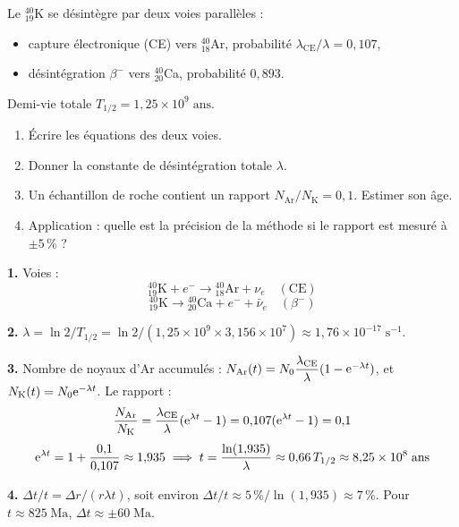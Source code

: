 \documentclass[12pt,a4paper]{article}
\begin{document}
\begin{boiteexercice}
Le ${}^{40}_{19}$K se désintègre par deux voies parallèles :
\begin{itemize}[nosep]
  \item capture électronique (CE) vers ${}^{40}_{18}$Ar, probabilité $\lambda_\text{CE}/\lambda = 0{,}107$,
  \item désintégration $\beta^-$ vers ${}^{40}_{20}$Ca, probabilité $0{,}893$.
\end{itemize}
Demi-vie totale $T_{1/2} = 1{,}25\times10^9\;\text{ans}$.
\begin{enumerate}
  \item Écrire les équations des deux voies.
  \item Donner la constante de désintégration totale $\lambda$.
  \item Un échantillon de roche contient un rapport $N_\text{Ar}/N_\text{K} = 0{,}1$. Estimer son âge.
  \item Application : quelle est la précision de la méthode si le rapport est mesuré à $\pm 5\,\%$ ?
\end{enumerate}
\end{boiteexercice}

\begin{boitecorrige}
\textbf{1.} Voies :
\[
{}^{40}_{19}\text{K} + e^- \to {}^{40}_{18}\text{Ar} + \nu_e \quad(\text{CE})
\]
\[
{}^{40}_{19}\text{K} \to {}^{40}_{20}\text{Ca} + e^- + \bar\nu_e \quad(\beta^-)
\]

\textbf{2.} $\lambda = \ln 2 / T_{1/2} = \ln 2/(1{,}25\times10^9\times 3{,}156\times10^7) \approx 1{,}76\times10^{-17}\;\text{s}^{-1}$.

\textbf{3.} Nombre de noyaux d'Ar accumulés : $N_\text{Ar}(t) = N_0 \dfrac{\lambda_\text{CE}}{\lambda}(1 - \mathrm{e}^{-\lambda t})$, et $N_\text{K}(t) = N_0\mathrm{e}^{-\lambda t}$. Le rapport :
\[
\frac{N_\text{Ar}}{N_\text{K}} = \frac{\lambda_\text{CE}}{\lambda}(\mathrm{e}^{\lambda t} - 1) = 0{,}107(\mathrm{e}^{\lambda t} - 1) = 0{,}1
\]
\[
\mathrm{e}^{\lambda t} = 1 + \frac{0{,}1}{0{,}107} \approx 1{,}935 \implies t = \frac{\ln(1{,}935)}{\lambda} \approx 0{,}66\,T_{1/2} \approx 8{,}25\times10^8\;\text{ans}
\]

\textbf{4.} $\Delta t/t = \Delta r/(r\lambda t)$, soit environ $\Delta t/t \approx 5\,\%/\ln(1{,}935) \approx 7\,\%$. Pour $t \approx 825\;\text{Ma}$, $\Delta t \approx \pm 60\;\text{Ma}$.
\end{boitecorrige}
\end{document}

